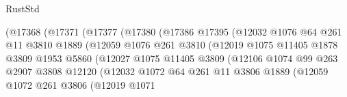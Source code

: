 \begin{lexlean}{RustStd}
\begin{coremodule}
                                (@17368
                                  (@17371
                                    (@17377
                                      (@17380
                                        (@17386
                                          @17395
                                          (@12032
                                            @1076
                                            @64
                                            @261
                                            @11
                                            @3810
                                            @1889
                                            (@12059
                                              @1076
                                              @261
                                              @3810
                                              (@12019
                                                @1075
                                                @11405
                                                @1878
                                                @3809
                                                @1953
                                                @5860
                                                (@12027
                                                  @1075
                                                  @11405
                                                  @3809
                                                  (@12106
                                                    @1074
                                                    @99
                                                    @263
                                                    @2907
                                                    @3808
                                                    @12120
                                                    (@12032
                                                      @1072
                                                      @64
                                                      @261
                                                      @11
                                                      @3806
                                                      @1889
                                                      (@12059
                                                        @1072
                                                        @261
                                                        @3806
                                                        (@12019
                                                          @1071

\end{coremodule}
\end{lexlean}
